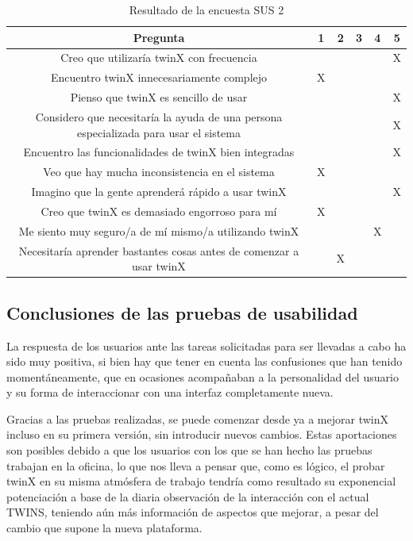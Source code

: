 \begin{table}[H]
	\begin{center}
		\begin{adjustbox}{width=\textwidth}
			\begin{tabular}{ | c | c | c | c | c | c | } 
				\hline
				\textbf{Pregunta} & 1 & 2 & 3 & 4 & 5 \\
				\hline
				Creo que utilizaría twinX con frecuencia &  &  &  &  & X \\
				\hline
				Encuentro twinX innecesariamente complejo &  X &  &  &  &  \\
				\hline
				Pienso que twinX es sencillo de usar &  &  &  &  & X \\
				\hline
				Considero que necesitaría la ayuda de una persona especializada para usar el sistema &  &  &  &  & X \\
				\hline
				Encuentro las funcionalidades de twinX bien integradas &  &  &  &  & X \\
				\hline
				Veo que hay mucha inconsistencia en el sistema & X &  &  &  &  \\
				\hline
				Imagino que la gente aprenderá rápido a usar twinX &  &  &  &  & X \\
				\hline
				Creo que twinX es demasiado engorroso para mí & X &  &  &  &  \\
				\hline
				Me siento muy seguro/a de mí mismo/a utilizando twinX &  &  &  & X &  \\
				\hline
				Necesitaría aprender bastantes cosas antes de comenzar a usar twinX &  & X &  &  &  \\
				\hline
			\end{tabular}
		\end{adjustbox}
		\caption{Resultado de la encuesta SUS 2}
		\label{tab:sus2}
	\end{center}
\end{table}

\subsection{Conclusiones de las pruebas de usabilidad}

La respuesta de los usuarios ante las tareas solicitadas para ser llevadas a cabo ha sido muy positiva, si bien hay que tener en cuenta las confusiones que han tenido momentáneamente, que en ocasiones acompañaban a la personalidad del usuario y su forma de interaccionar con una interfaz completamente nueva.

Gracias a las pruebas realizadas, se puede comenzar desde ya a mejorar twinX incluso en su primera versión, sin introducir nuevos cambios. Estas aportaciones son posibles debido a que los usuarios con los que se han hecho las pruebas trabajan en la oficina, lo que nos lleva a pensar que, como es lógico, el probar twinX en su misma atmósfera de trabajo tendría como resultado su exponencial potenciación a base de la diaria observación de la interacción con el actual TWINS, teniendo aún más información de aspectos que mejorar, a pesar del cambio que supone la nueva plataforma.

